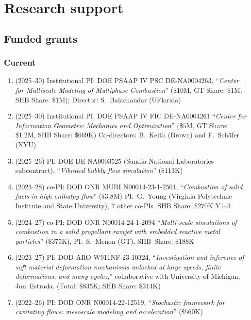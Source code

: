 \section{Research support}

% 

\subsection{Funded grants}

\subsubsection{Current}

\begin{enumerate}
    \item (2025--30) Institutional PI: DOE PSAAP IV PSC DE-NA0004263, ``\textit{Center for Multiscale Modeling of Multiphase Combustion}'' ($\$10$M, GT Share: \$1M, SHB Share: \$1M); Director: S.~Balachandar (UFlorida)
    \item (2025--30) Institutional PI: DOE PSAAP IV FIC DE-NA0004261 ``\textit{Center for Information Geometric Mechanics and Optimization}'' ($\$5$M, GT Share: \$1.2M, SHB Share: \$669K) Co-directors: B.~Keith (Brown) and F.~Sch\"afer (NYU)
    \item (2025--26) PI: DOE DE-NA0003525 (Sandia National Laboratories subcontract), ``\textit{Vibrated bubbly flow simulation}'' ($\$113$K)
    \item (2023--28) co-PI: DOD ONR MURI N00014-23-1-2501, ``\textit{Combustion of solid fuels in high enthalpy flow}'' ($\$3.8$M) PI:~G.~Young (Virginia Polytechnic Institute and State University), 7 other co-PIs. SHB Share: $\$270$K Y1--3
    \item (2024--27) co-PI: DOD ONR N00014-24-1-2094 ``\textit{Multi-scale simulations of combustion in a solid propellant ramjet with embedded reactive metal particles}'' ($\$375$K), PI:~S.~Menon (GT), SHB~Share: $\$188$K 
    \item (2023--27) PI: DOD ARO W911NF-23-10324, ``\textit{Investigation and inference of soft material deformation mechanisms unlocked at large speeds, finite deformations, and many cycles},'' collaborative with University of Michigan, Jon~Estrada. (Total: $\$835$K; SHB Share: $\$314$K)
    \item (2022--26) PI: DOD ONR N00014-22-12519, ``\textit{Stochastic framework for cavitating flows: mesoscale modeling and acceleration}'' ($\$560$K)
\end{enumerate}

